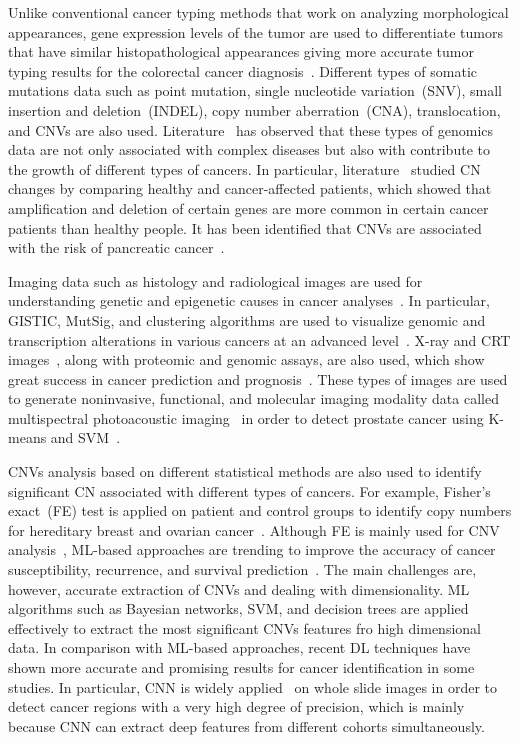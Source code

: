 \hspace*{3.5mm} Unlike conventional cancer typing methods that work on analyzing morphological appearances, gene expression levels of the tumor are used to differentiate tumors that have similar histopathological appearances giving more accurate tumor typing results for the colorectal cancer diagnosis~\cite{paroder2006na+}. Different types of somatic mutations data such as point mutation, single nucleotide variation~(SNV), small insertion and deletion~(INDEL), copy number aberration~(CNA), translocation, and CNVs are also used. Literature~\cite{yuan2018cancer} has observed that these types of genomics data are not only associated with complex diseases but also with contribute to the growth of different types of cancers. In particular, literature~\cite{67Calcagno} studied CN changes by comparing healthy and cancer-affected patients, which showed that amplification and deletion of certain genes are more common in certain cancer patients than healthy people. It has been identified that CNVs are associated with the risk of pancreatic cancer~\cite{66Huang}. 

\hspace*{3.5mm} Imaging data such as histology and radiological images are used for understanding genetic and epigenetic causes in cancer analyses~\cite{yuan2018cancer,20Rajanna,23Zheng}. In particular, GISTIC, MutSig, and clustering algorithms are used to visualize genomic and transcription alterations in various cancers at an advanced level~\cite{wb}. X-ray and CRT images~\cite{25Cruz}, along with proteomic and genomic assays, are also used, which show great success in cancer prediction and prognosis~\cite{28Zhou}. These types of images are used to generate noninvasive, functional, and molecular imaging modality data called multispectral photoacoustic imaging~\cite{20Rajanna} in order to detect prostate cancer using K-means and SVM~\cite{23Zheng}. 

\hspace*{3.5mm} CNVs analysis based on different statistical methods are also used to identify significant CN associated with different types of cancers. For example, Fisher's exact~(FE) test is applied on patient and control groups to identify copy numbers for hereditary breast and ovarian cancer~\cite{58Kuusisto}. Although FE is mainly used for CNV analysis~\cite{fish}, ML-based approaches are trending to improve the accuracy of cancer susceptibility, recurrence, and survival prediction~\cite{16Kourou}. The main challenges are, however, accurate extraction of CNVs and dealing with dimensionality. ML algorithms such as Bayesian networks, SVM, and decision trees are applied effectively to extract the most significant CNVs features fro high dimensional data. In comparison with ML-based approaches, recent DL techniques have shown more accurate and promising results for cancer identification in some studies. In particular, CNN is widely applied~\cite{19Cruz} on whole slide images in order to detect cancer regions with a very high degree of precision, which is mainly because CNN can extract deep features from different cohorts simultaneously. 

